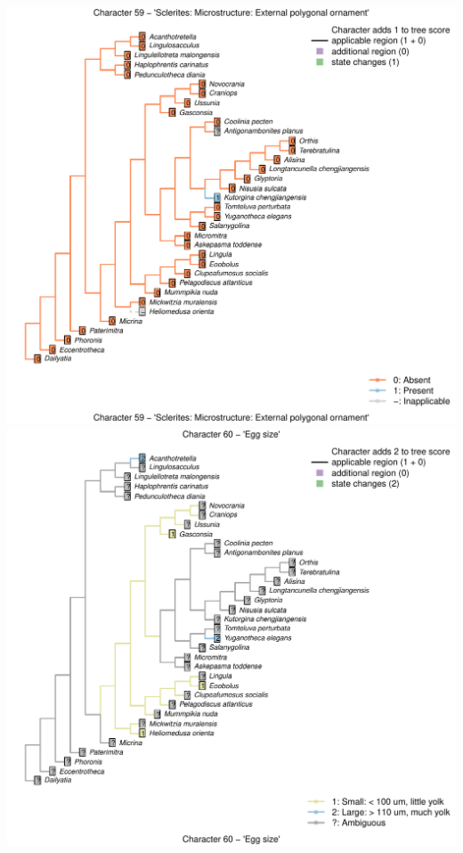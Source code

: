 \documentclass[]{book}
\theoremstyle{definition}
\theoremstyle{definition}
\theoremstyle{definition}
\theoremstyle{remark}
\begin{document}
\includegraphics{Brachiopod_phylogeny_files/figure-latex/unnamed-chunk-4-59.pdf}
\includegraphics{Brachiopod_phylogeny_files/figure-latex/unnamed-chunk-4-60.pdf}
\end{document}
